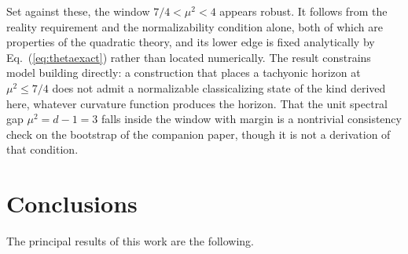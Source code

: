 \documentclass[aps,prd,twocolumn,superscriptaddress,nofootinbib,longbibliography]{revtex4-2}
\begin{document}
Set against these, the window $7/4<\mu^2<4$ appears robust. It follows from
the reality requirement and the normalizability condition alone, both of
which are properties of the quadratic theory, and its lower edge is fixed
analytically by Eq.~(\ref{eq:thetaexact}) rather than located numerically.
The result constrains model building directly: a construction
that places a tachyonic horizon at $\mu^2\le7/4$ does not admit a
normalizable classicalizing state of the kind derived here, whatever
curvature function produces the horizon. That the unit spectral gap
$\mu^2=d-1=3$ falls inside the window with margin is a nontrivial
consistency check on the bootstrap of the companion paper, though it is not
a derivation of that condition.

\section{Conclusions}
\label{sec:conclusions}
The principal results of this work are the following.
\end{document}
